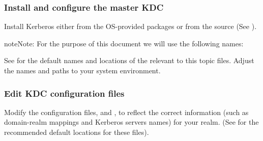 \documentclass[letterpaper,10pt,english]{sphinxmanual}
\begin{document}
\subsubsection{Install and configure the master KDC}
\label{\detokenize{admin/install_kdc:install-and-configure-the-master-kdc}}
Install Kerberos either from the OS-provided packages or from the
source (See ).

\begin{sphinxadmonition}{note}{Note:}
For the purpose of this document we will use the following
names:

%
\begin{sphinxVerbatim}[commandchars=\\\{\}]
      
    
        
    
           
\end{sphinxVerbatim}

See {\hyperref[\detokenize{mitK5defaults:mitk5defaults}]{}} for the default names and locations
of the relevant to this topic files.  Adjust the names and
paths to your system environment.
\end{sphinxadmonition}


\subsubsection{Edit KDC configuration files}
\label{\detokenize{admin/install_kdc:edit-kdc-configuration-files}}
Modify the configuration files, {\hyperref[\detokenize{admin/conf_files/krb5_conf:krb5-conf-5}]{}} and
{\hyperref[\detokenize{admin/conf_files/kdc_conf:kdc-conf-5}]{}}, to reflect the correct information (such as
domain-realm mappings and Kerberos servers names) for your realm.
(See {\hyperref[\detokenize{mitK5defaults:mitk5defaults}]{}} for the recommended default locations for
these files).
\end{document}
